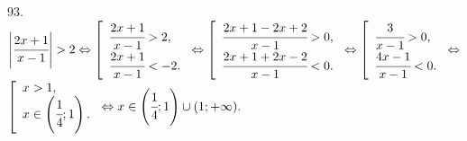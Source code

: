 93. $\left|\cfrac{2x+1}{x-1}\right|>2\Leftrightarrow
\left[\begin{array}{l} \cfrac{2x+1}{x-1}>2,\\ \cfrac{2x+1}{x-1}<-2.\end{array}\right.\Leftrightarrow
\left[\begin{array}{l} \cfrac{2x+1-2x+2}{x-1}>0,\\ \cfrac{2x+1+2x-2}{x-1}<0.\end{array}\right.\Leftrightarrow
\left[\begin{array}{l} \cfrac{3}{x-1}>0,\\ \cfrac{4x-1}{x-1}<0.\end{array}\right.\Leftrightarrow$\\$
\left[\begin{array}{l} x>1,\\ x\in\left(\cfrac{1}{4}; 1\right).\end{array}\right.\Leftrightarrow x\in\left(\cfrac{1}{4}; 1\right)\cup(1;+\infty).$\\
